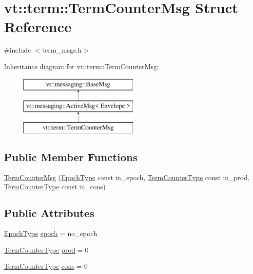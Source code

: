 \hypertarget{structvt_1_1term_1_1_term_counter_msg}{}\section{vt\+:\+:term\+:\+:Term\+Counter\+Msg Struct Reference}
\label{structvt_1_1term_1_1_term_counter_msg}


{\ttfamily \#include $<$term\+\_\+msgs.\+h$>$}

Inheritance diagram for vt\+:\+:term\+:\+:Term\+Counter\+Msg\+:\begin{figure}[H]
\begin{center}
\leavevmode
\includegraphics[height=3.000000cm]{structvt_1_1term_1_1_term_counter_msg}
\end{center}
\end{figure}
\subsection*{Public Member Functions}
\begin{DoxyCompactItemize}
\item 
\hyperlink{structvt_1_1term_1_1_term_counter_msg_a5728a2f05ae6a3ccf0cac09098983b0f}{Term\+Counter\+Msg} (\hyperlink{namespacevt_a985a5adf291c34a3ca263b3378388236}{Epoch\+Type} const in\+\_\+epoch, \hyperlink{namespacevt_1_1term_a4fd378cdb0c36683afc1b3399d685f7f}{Term\+Counter\+Type} const in\+\_\+prod, \hyperlink{namespacevt_1_1term_a4fd378cdb0c36683afc1b3399d685f7f}{Term\+Counter\+Type} const in\+\_\+cons)
\end{DoxyCompactItemize}
\subsection*{Public Attributes}
\begin{DoxyCompactItemize}
\item 
\hyperlink{namespacevt_a985a5adf291c34a3ca263b3378388236}{Epoch\+Type} \hyperlink{structvt_1_1term_1_1_term_counter_msg_af523f9872306ba8ad1c4ad49694b3ee8}{epoch} = no\+\_\+epoch
\item 
\hyperlink{namespacevt_1_1term_a4fd378cdb0c36683afc1b3399d685f7f}{Term\+Counter\+Type} \hyperlink{structvt_1_1term_1_1_term_counter_msg_a4fd3f09a9e5a54865abbd76a95ea7067}{prod} = 0
\item 
\hyperlink{namespacevt_1_1term_a4fd378cdb0c36683afc1b3399d685f7f}{Term\+Counter\+Type} \hyperlink{structvt_1_1term_1_1_term_counter_msg_a212c8487c01cd837aae027823fa32208}{cons} = 0
\end{DoxyCompactItemize}
